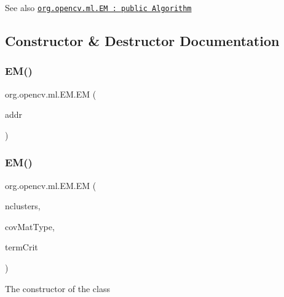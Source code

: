 \begin{DoxySeeAlso}{See also}
\href{http://docs.opencv.org/modules/ml/doc/expectation_maximization.html#em}{\tt org.\+opencv.\+ml.\+EM \+: public Algorithm} 
\end{DoxySeeAlso}


\subsection{Constructor \& Destructor Documentation}
\mbox{\label{classorg_1_1opencv_1_1ml_1_1_e_m_afc05e1235750dcbfeab4f2bd81169de5}} 
\subsubsection{\texorpdfstring{E\+M()}{EM()}\hspace{0.1cm}{\footnotesize\ttfamily [1/3]}}
{\footnotesize\ttfamily org.\+opencv.\+ml.\+E\+M.\+EM (\begin{DoxyParamCaption}\item[{long}]{addr }\end{DoxyParamCaption})\hspace{0.3cm}{\ttfamily [protected]}}

\mbox{\label{classorg_1_1opencv_1_1ml_1_1_e_m_acd119ab4c952342f4a5b48ba851e3280}} 
\subsubsection{\texorpdfstring{E\+M()}{EM()}\hspace{0.1cm}{\footnotesize\ttfamily [2/3]}}
{\footnotesize\ttfamily org.\+opencv.\+ml.\+E\+M.\+EM (\begin{DoxyParamCaption}\item[{int}]{nclusters,  }\item[{int}]{cov\+Mat\+Type,  }\item[{\mbox{\hyperlink{classorg_1_1opencv_1_1core_1_1_term_criteria}{Term\+Criteria}}}]{term\+Crit }\end{DoxyParamCaption})}

The constructor of the class



